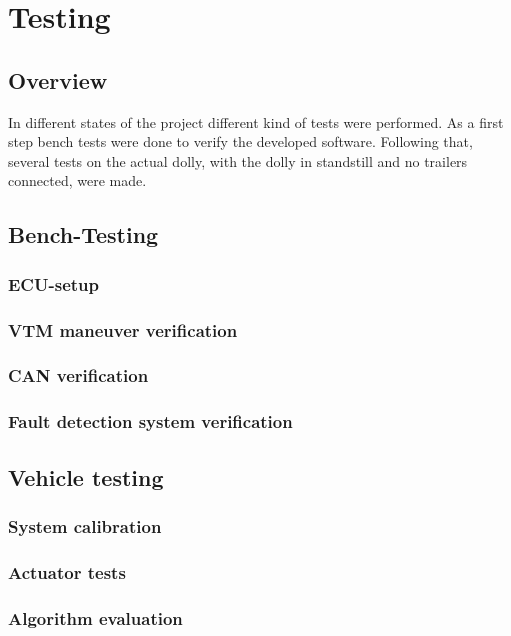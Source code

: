 \documentclass[ExampleMasters.tex]{subfiles}
\begin{document}
\clearpage
\chapter{Testing}
\label{chap:testing}

\section{Overview}
In different states of the project different kind of tests were performed. As a first step bench tests were done to verify the developed software. Following that, several tests on the actual dolly, with the dolly in standstill and no trailers connected, were made.

\section{Bench-Testing}
\label{sec:bench-testing}
\subsection{ECU-setup}
\subsection{VTM maneuver verification}
\subsection{CAN verification}


\subsection{Fault detection system verification}
\label{sec:fault_detect_test}


\section{Vehicle testing}
\label{sec:vehicle-testing}

\subsection{System calibration}
\subsection{Actuator tests}
\subsection{Algorithm evaluation}
\end{document}
